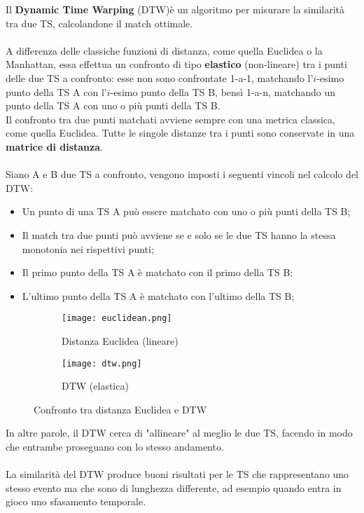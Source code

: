 Il \textbf{Dynamic Time Warping} (DTW)\cite{dtw}è un algoritmo per misurare la similarità tra due TS, calcolandone il match ottimale.\\
\\
A differenza delle classiche funzioni di distanza, come quella Euclidea o la Manhattan, essa effettua un confronto di tipo \textbf{elastico} (non-lineare) tra i punti delle due TS a confronto: esse non sono confrontate 1-a-1, matchando l'$i$-esimo punto della TS A con l'$i$-esimo punto della TS B, bensì 1-a-n, matchando un punto della TS A con uno o più punti della TS B.\\
Il confronto tra due punti matchati avviene sempre con una metrica classica, come quella Euclidea. Tutte le singole distanze tra i punti sono conservate in una \textbf{matrice di distanza}.\\
\\
Siano A e B due TS a confronto, vengono imposti i seguenti vincoli nel calcolo del DTW:
\begin{itemize}
	\item Un punto di una TS A può essere matchato con uno o più punti della TS B;
	\item Il match tra due punti può avviene se e solo se le due TS hanno la stessa monotonia nei rispettivi punti;
	\item Il primo punto della TS A è matchato con il primo della TS B;
	\item L'ultimo punto della TS A è matchato con l'ultimo della TS B; 
\end{itemize}
\begin{figure}[H]
	\centering
	\begin{subfigure}{.5\textwidth}
		\centering
		\texttt{[image: euclidean.png]}
		\caption{Distanza Euclidea (lineare)}
		\label{fig:distance_euclidean}
	\end{subfigure}%
	\begin{subfigure}{.5\textwidth}
		\centering
		\texttt{[image: dtw.png]}
		\caption{DTW (elastica)}
		\label{fig:distance_dtw}
	\end{subfigure}
	\caption{Confronto tra distanza Euclidea e DTW}
	\label{fig:distance}
\end{figure}
In altre parole, il DTW cerca di "allineare" al meglio le due TS, facendo in modo che entrambe proseguano con lo stesso andamento.\\
\\
La similarità del DTW produce buoni risultati per le TS che rappresentano uno stesso evento ma che sono di lunghezza differente, ad esempio quando entra in gioco uno sfasamento temporale.\\

